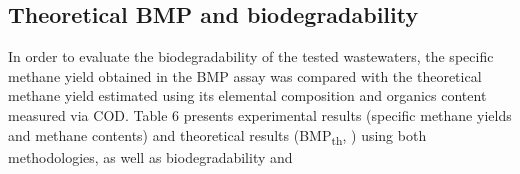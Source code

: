 \subsection{Theoretical BMP and biodegradability}
In order to evaluate the biodegradability of the tested wastewaters, the specific methane yield obtained in the BMP assay was compared with the theoretical methane yield estimated using its elemental composition and organics content measured via COD. Table 6 presents experimental results (specific methane yields and methane contents) and theoretical results (BMP\textsubscript{th}, ) using both methodologies, as well as biodegradability and 
